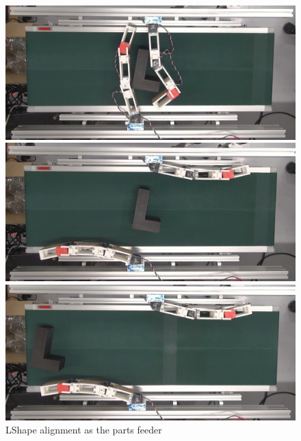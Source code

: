 \documentclass[a4paper,twoside,12pt,papersize, dvipdfmx]{iirthesis}
\begin{document}
\begin{figure}[hb]
\begin{minipage}{0.49\hsize}
\subcaption{}
\end{minipage}\hfill
\begin{minipage}{0.49\hsize}
\includegraphics[width=0.98\hsize]{fig/4-manipulation-result/LShape/3-4.jpg}
\subcaption{}
\end{minipage}\hfill
\begin{minipage}{0.49\hsize}
\includegraphics[width=0.98\hsize]{fig/4-manipulation-result/LShape/3-5.jpg}
\subcaption{}
\end{minipage}\hfill
\begin{minipage}{0.49\hsize}
\includegraphics[width=0.98\hsize]{fig/4-manipulation-result/LShape/3-6.jpg}
\subcaption{}
\end{minipage}\hfill
\caption{LShape alignment as the parts feeder}\label{fig::result::lp}
\end{figure}
\end{document}
